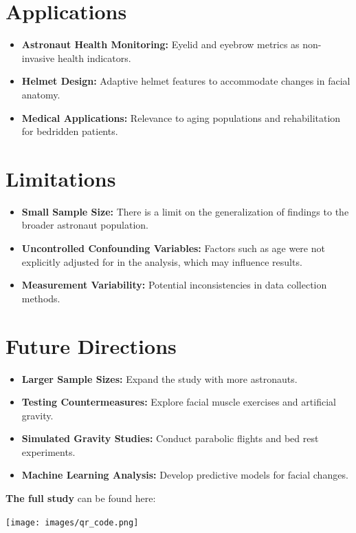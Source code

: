 \documentclass[a0paper,fleqn]{betterposter}
\begin{document}
{%

}{
\section{Applications}
\begin{itemize}
\item \textbf{Astronaut Health Monitoring:} Eyelid and eyebrow metrics as non-invasive health indicators.
\item \textbf{Helmet Design:} Adaptive helmet features to accommodate changes in facial anatomy.
\item \textbf{Medical Applications:} Relevance to aging populations and rehabilitation for bedridden patients.
\end{itemize}

\section{Limitations}
\begin{itemize}
\item \textbf{Small Sample Size:} There is a limit on the generalization of findings to the broader astronaut population.
\item \textbf{Uncontrolled Confounding Variables:} Factors such as age were not explicitly adjusted for in the analysis, which may influence results. 
\item \textbf{Measurement Variability:} Potential inconsistencies in data collection methods.
\end{itemize} 

\section{Future Directions}
\begin{itemize}
\item \textbf{Larger Sample Sizes:} Expand the study with more astronauts.
\item \textbf{Testing Countermeasures:} Explore facial muscle exercises and artificial gravity.
\item \textbf{Simulated Gravity Studies:}  Conduct parabolic flights and bed rest experiments.
\item \textbf{Machine Learning Analysis:} Develop predictive models for facial changes. \\
\end{itemize} 

\vfill


\textbf{The full study} can be found here:
\begin{center}
\texttt{[image: images/qr\_code.png]}{
}
\end{center}

}
\end{document}
